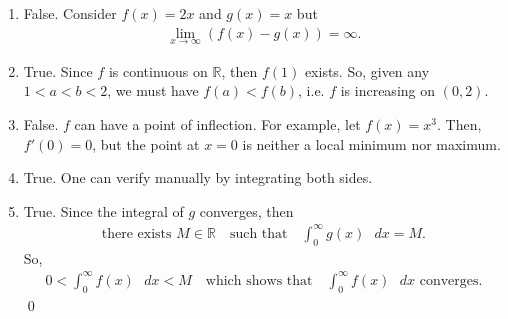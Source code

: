 \documentclass[12pt]{article}
\begin{document}
\begin{enumerate}[label=\textbf{(\alph*)}]
    \itemsep 0em
    \item False. Consider $f\left(x\right)=2x$ and $g\left(x\right)=x$ but \begin{align*}
        \lim_{x\rightarrow\infty}\left(f\left(x\right)-g\left(x\right)\right)=\infty.
    \end{align*}
    \item True. Since $f$ is continuous on $\mathbb{R}$, then $f\left(1\right)$ exists. So, given any $1<a<b<2$, we must have $f\left(a\right)<f\left(b\right)$, i.e. $f$ is increasing on $\left(0,2\right)$.
    \item False. $f$ can have a point of inflection. For example, let $f\left(x\right)=x^3$. Then, $f'\left(0\right)=0$, but the point at $x=0$ is neither a local minimum nor maximum.
    \item True. One can verify manually by integrating both sides.
    \item True. Since the integral of $g$ converges, then \begin{align*}
        \text{there exists }M\in\mathbb{R}\quad\text{such that}\quad \int_{0}^{\infty}g\left(x\right)\text{ }dx=M.
    \end{align*}
    So, \begin{align*}
        0<\int_{0}^{\infty}f\left(x\right)\text{ }dx<M\quad\text{which shows that}\quad \int_{0}^{\infty}f\left(x\right)\text{ }dx\text{ converges}.
    \end{align*}\qed 
\end{enumerate}
\newpage
\end{document}

